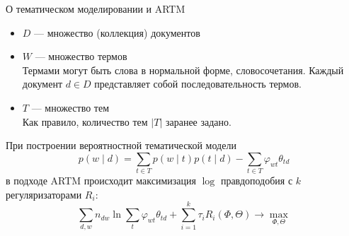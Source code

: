 \documentclass{beamer}
\begin{document}
\begin{frame}{О тематическом моделировании и ARTM}
    \begin{itemize}
        \item $D$ — множество (коллекция) документов
        \item $W$ — множество термов \\ {\footnotesize Термами могут быть слова в нормальной форме, словосочетания. Каждый документ $d \in D$ представляет собой последовательность термов.}
        \item $T$ — множество тем \\ {\footnotesize Как правило, количество тем $|T|$ заранее задано.}
    \end{itemize}

    При построении вероятностной тематической модели
    $$p (w \mid d) = \sum \limits_{t \in T} p (w \mid t) p (t \mid d) - \sum \limits_{t \in T} \varphi_{wt} \theta_{td}$$
    в подходе ARTM происходит максимизация $\log$ правдоподобия с $k$ регуляризаторами $R_i$:
    $$\sum \limits_{d, w} n_{dw} \ln \sum \limits_{t} \varphi_{wt} \theta_{td} + \sum \limits_{i = 1}^k \tau_i R_i (\Phi, \Theta) \to \max \limits_{\Phi, \Theta}$$
\end{frame}
\end{document}
